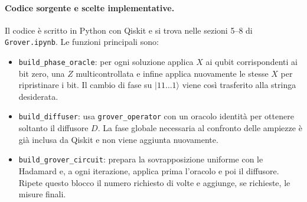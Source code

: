 ﻿\documentclass[a4paper,12pt]{article}
\begin{document}
\paragraph{Codice sorgente e scelte implementative.}
Il codice è scritto in Python con Qiskit e si trova nelle sezioni
5--8 di \texttt{Grover.ipynb}. Le funzioni principali sono:
\begin{itemize}
    \item \texttt{build\_phase\_oracle}: per ogni soluzione applica
    $X$ ai qubit corrispondenti ai bit zero, una $Z$ multicontrollata
    e infine applica nuovamente le stesse $X$ per ripristinare i bit.
    Il cambio di fase su $|11\ldots1\rangle$
    viene così trasferito alla stringa desiderata.
    \item \texttt{build\_diffuser}: usa \texttt{grover\_operator} con
    un oracolo identità per ottenere soltanto il diffusore $D$.
    La fase globale necessaria al confronto delle ampiezze
    è già inclusa da Qiskit e non viene aggiunta nuovamente.
    \item \texttt{build\_grover\_circuit}: prepara la sovrapposizione
    uniforme con le Hadamard e, a ogni iterazione, applica prima
    l'oracolo e poi il diffusore. Ripete questo blocco il numero richiesto di volte
    e aggiunge, se richieste, le misure finali.
\end{itemize}
\end{document}
